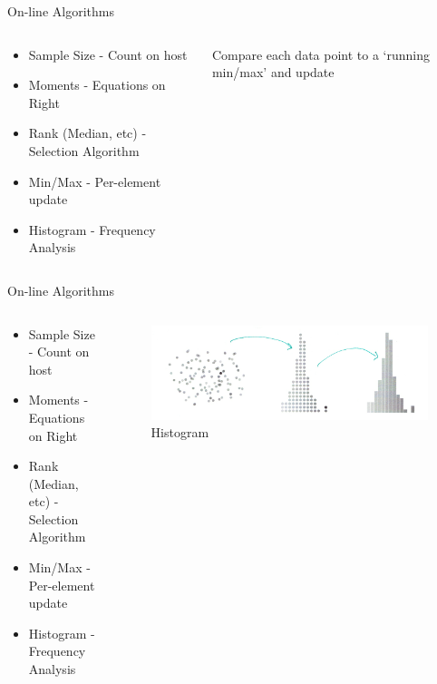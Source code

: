 \documentclass[10pt,aspectratio=169]{beamer} %
\newcommand{\hide}[1] {
	\textcolor{hiddencolor}{#1}
}
\begin{document}
\begin{frame}{On-line Algorithms}
\begin{columns}[c]
\begin{column}{0.5\textwidth}
\begin{itemize}
\item \hide{Sample Size - Count on host}
\item \hide{Moments - Equations on Right}
\item \hide{Rank (Median, etc) - Selection Algorithm}
\item \alert{Min/Max - Per-element update}
\item \hide{Histogram - Frequency Analysis}
\end{itemize}
\end{column}
\begin{column}{0.5\textwidth}
Compare each data point to a `running min/max' and update
\end{column}
\end{columns}
\end{frame}

\begin{frame}{On-line Algorithms}
\begin{columns}[c]
\begin{column}{0.5\textwidth}
\begin{itemize}
\item \hide{Sample Size - Count on host}
\item \hide{Moments - Equations on Right}
\item \hide{Rank (Median, etc) - Selection Algorithm}
\item \hide{Min/Max - Per-element update}
\item \alert{Histogram - Frequency Analysis}
\end{itemize}
\end{column}
\begin{column}{0.5\textwidth}
\begin{figure}
    \includegraphics[width=\textwidth]{histogram.png}
    \caption{Histogram}
\end{figure}
\end{column}
\end{columns}
\end{frame}
\end{document}
